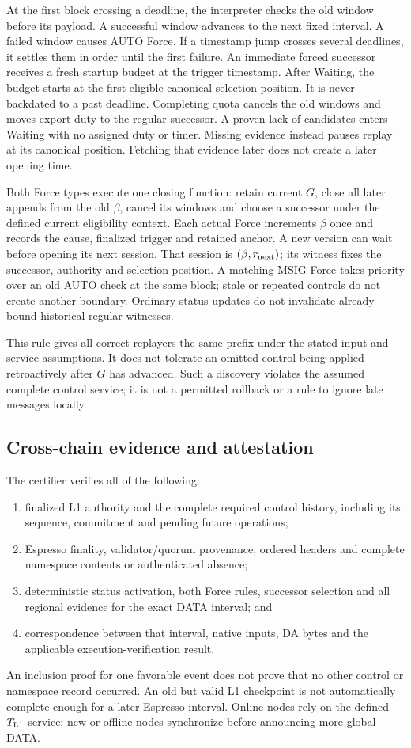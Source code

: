 \documentclass[11pt,a4paper]{article}
\begin{document}
At the first block crossing a deadline, the interpreter checks the old
window before its payload. A successful window advances to the next
fixed interval. A failed window causes AUTO Force. If a timestamp jump
crosses several deadlines, it settles them in order until the first
failure. An immediate forced successor receives a fresh startup budget
at the trigger timestamp. After Waiting, the budget starts at the first
eligible canonical selection position. It is never backdated to a past
deadline. Completing quota cancels the old windows and moves export duty
to the regular successor. A proven lack of candidates enters Waiting
with no assigned duty or timer. Missing evidence instead pauses replay
at its canonical position. Fetching that evidence later does not create
a later opening time.

Both Force types execute one closing function: retain current $G$,
close all later appends from the old $\beta$, cancel its windows and
choose a successor under the defined current eligibility context.
Each actual Force increments $\beta$ once and records the cause,
finalized trigger and retained anchor. A new version can wait before
opening its next session. That session is $(\beta,r_{\rm next})$;
its witness fixes the successor, authority and selection position. A matching MSIG Force takes priority over an old AUTO check
at the same block; stale or repeated controls do not create another
boundary. Ordinary status updates do not invalidate already bound
historical regular witnesses.

This rule gives all correct replayers the same prefix under the stated
input and service assumptions. It does not tolerate an omitted control
being applied retroactively after $G$ has advanced. Such a discovery
violates the assumed complete control service; it is not a permitted
rollback or a rule to ignore late messages locally.

\subsection{Cross-chain evidence and attestation}
The certifier verifies all of the following:
\begin{enumerate}
\item finalized L1 authority and the complete required control history,
including its sequence, commitment and pending future operations;
\item Espresso finality, validator/quorum provenance, ordered headers
and complete namespace contents or authenticated absence;
\item deterministic status activation, both Force rules, successor
selection and all regional evidence for the exact DATA interval; and
\item correspondence between that interval, native inputs, DA bytes and
the applicable execution-verification result.
\end{enumerate}
An inclusion proof for one favorable event does not prove that no other
control or namespace record occurred. An old but valid L1 checkpoint
is not automatically complete enough for a later Espresso interval.
Online nodes rely on the defined $T_{\rm L1}$ service; new or offline
nodes synchronize before announcing more global DATA.
\end{document}

